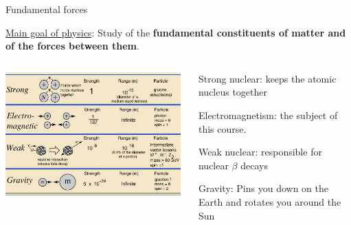 %
%
%

\begin{frame}{Fundamental forces}

\underline{Main goal of physics}:
Study of the {\bf fundamental constituents of matter and of the forces between them}.\\
\vspace{0.2cm}

\begin{columns}
  \begin{column}{0.60\textwidth}
   \begin{center}
     \includegraphics[width=0.98\textwidth]{./images/schematics/fundamental_forces.png}\\
   \end{center}
  \end{column}
  \begin{column}{0.40\textwidth}
    \begin{itemize}
    {\small
      \item Strong nuclear: keeps the atomic nucleus together
      \item {\color{magenta}Electromagnetism: the subject of this course.}
      \item Weak nuclear: responsible for nuclear $\beta$ decays
      \item Gravity: Pins you down on the Earth and rotates you around the Sun
    }
    \end{itemize}
  \end{column}
\end{columns}

\end{frame}

